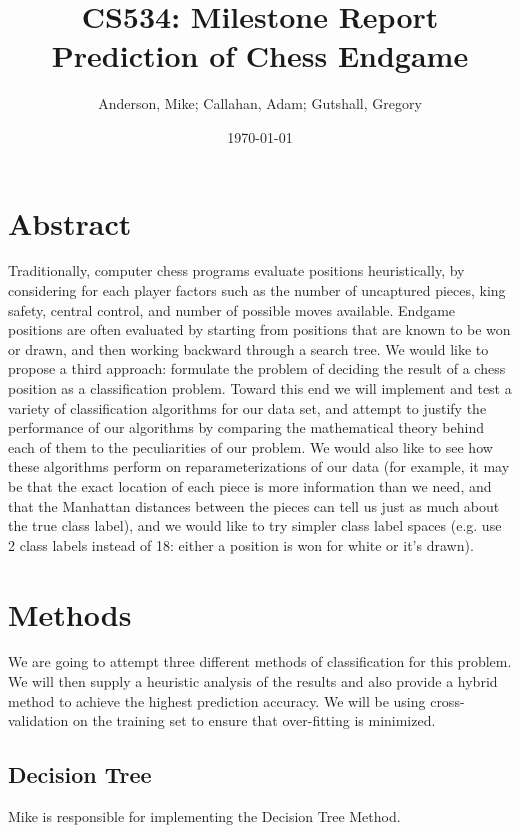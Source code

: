 \documentclass[10pt,fleqn]{article}%
\begin{document}

\title{CS534: Milestone Report\\
Prediction of Chess Endgame}
\author{Anderson, Mike; Callahan, Adam; Gutshall, Gregory}
\date{\today}
\maketitle

\section*{Abstract}
Traditionally, computer chess programs evaluate positions heuristically, by considering for each player factors such as the number of uncaptured pieces, king safety, central control, and number of possible moves available. Endgame positions are often evaluated by starting from positions that are known to be won or drawn, and then working backward through a search tree. We would like to propose a third approach: formulate the problem of deciding the result of a chess position as a classification problem. Toward this end we will implement and test a variety of classification algorithms for our data set, and attempt to justify the performance of our algorithms by comparing the mathematical theory behind each of them to the peculiarities of our problem. We would also like to see how these algorithms perform on reparameterizations of our data (for example, it may be that the exact location of each piece is more information than we need, and that the Manhattan distances between the pieces can tell us just as much about the true class label), and we would like to try simpler class label spaces (e.g. use 2 class labels instead of 18: either a position is won for white or it's drawn).

\section{Methods}
\label{sec:methods}
We are going to attempt three different methods of classification for this problem.  We will then supply a heuristic analysis of the results and also provide a hybrid method to achieve the highest prediction accuracy.  We will be using cross-validation on the training set to ensure that over-fitting is minimized.
%
\subsection{Decision Tree}
\label{subsec:Mike}
Mike is responsible for implementing the Decision Tree Method.
\end{document}

